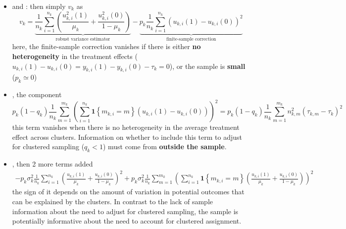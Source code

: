 \documentclass[twoside]{article}
\begin{document}
\begin{itemize}
    \item {} and : then simply $v_k$ as
    \begin{equation*}
        v_k = \underbrace{\frac{1}{n_k} \sum^{n_k}_{i=1}\left( \frac{u_{k,i}^2(1)}{\mu_k} + \frac{u^2_{k,i}(0)}{1-\mu_k} \right)}_{\text{robust variance estimator}} - \underbrace{p_k \frac{1}{n_k} \sum^{n_k}_{i=1}\left(u_{k,i}(1)-u_{k,i}(0)\right)^2}_{\text{finite-sample correction}}
    \end{equation*} 
    here, the finite-sample correction vanishes if there is either \textbf{no heterogeneity} in the treatment effects ($u_{k,i}(1)- u_{k,i}(0) = y_{k,i}(1)-y_{k,i}(0) - \tau_k=0$), or the sample is \textbf{small} ($p_k\simeq 0$)
    \item {}, the component 
    \begin{equation*}
        p_k\left(1-q_k\right) \frac{1}{n_k}\sum^{m_k}_{m=1}\left(\sum^{n_k}_{i=1} \mathbf{1}\left\{m_{k,i}=m\right\} \left(u_{k,i}(1)-u_{k,i}(0)\right) \right)^2 = p_k(1-q_k) \frac{1}{n_k} \sum^{m_k}_{m=1} n^2_{k,m} \left(\tau_{k,m}-\tau_k\right)^2
    \end{equation*}
    this term vanishes when there is no heterogeneity in the average treatment effect across clusters. Information on whether to include this term to adjust for clustered sampling ($q_k<1$) must come from \textbf{outside the sample}.
    \item {}, then 2 more terms added 
    \begin{align*}
        -p_k\sigma^2_k \frac{1}{n_k} \sum^{n_k}_{i=1} \left( \frac{u_{k,i}(1)}{\mu_k} + \frac{u_{k,i}(0)}{1-\mu_k} \right)^2 + p_k\sigma^2_k \frac{1}{n_k}\sum^{m_k}_{m=1} \left(\sum^{n_k}_{i=1} \mathbf{1}\left\{m_{k,i}=m\right\} \left(\frac{u_{k,i}(1)}{\mu_k} + \frac{u_{k,i}(0)}{1-\mu_k}\right)\right)^2
    \end{align*}
    the sign of it depends on the amount of variation in potential outcomes that can be explained by the clusters. In contrast to the lack of sample information about the need to adjust for clustered sampling, the sample is potentially informative about the need to account for clustered assignment.
\end{itemize}
\end{document}
